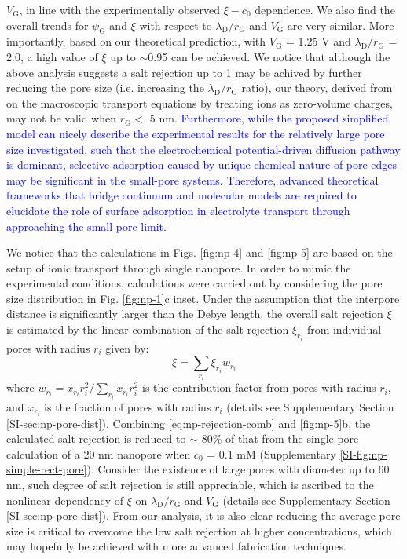 $V_{\mathrm{G}}$, in line with the experimentally observed
$\xi - c_{0}$ dependence. We also find the overall trends for
$\psi_{\mathrm{G}}$ and $\xi$ with respect to
$\lambda_{\mathrm{D}}/r_{\mathrm{G}}$ and $V_{\mathrm{G}}$ are very
similar. More importantly, based on our theoretical prediction, with
$V_{\mathrm{G}}$ = 1.25 V and $\lambda_{\mathrm{D}} / r_{\mathrm{G}}$
= { 2.0}, a high value of $\xi$ up to $\sim$0.95 can be achieved.  We
notice that although the above analysis suggests a salt rejection up
to 1 may be achived by further reducing the pore size (i.e. increasing
the $\lambda_{\mathrm{D}}/r_{\mathrm{G}}$ ratio), our theory, derived
from on the macroscopic transport equations by treating ions as
zero-volume charges, may not be valid when $r_{\mathrm{G}}<$ 5
nm\cite{Jain_2015_subcontin_ion}. \textcolor{blue}{ Furthermore, while the proposed
  simplified model can nicely describe the experimental results for
  the relatively large pore size investigated, such that the
  electrochemical potential-driven diffusion pathway is dominant,
  selective adsorption caused by unique chemical nature of pore edges
  may be significant in the small-pore systems. Therefore, advanced
  theoretical frameworks that bridge continuum and molecular models
  are required to elucidate the role of surface adsorption in
  electrolyte transport through approaching the small pore limit. }



{
We notice that the calculations in Figs. \autoref{fig:np-4} and \autoref{fig:np-5} 
are based on the setup  of ionic transport through single nanopore.
In order to mimic the experimental conditions, 
calculations were carried out by considering the pore size distribution in Fig. \autoref{fig:np-1}c inset. 
Under the assumption that the interpore distance is significantly larger than the Debye length,
the overall salt rejection $\xi$ is
estimated by the linear combination of the salt rejection 
$\xi_{r_i}$ 
from individual pores with radius $r_i$ given by:
\begin{equation}
\label{eq:np-rejection-comb}
\xi = \sum_{r_{i}} \xi_{r_{i}} w_{r_{i}}
\end{equation}
where
$w_{r_{i}} = x_{r_{i}} r_{i}^{2} / \sum_{r_{i}} x_{r_{i}} r_{i}^{2} $
is the contribution factor from pores with radius $r_{i}$, and
$x_{r_{i}}$ is the fraction of pores with radius $r_{i}$ (details see
Supplementary Section \autoref{SI-sec:np-pore-dist}). Combining
 \autoref{eq:np-rejection-comb} and  \autoref{fig:np-5}b, the calculated
salt rejection is reduced to $\sim{}$ 80\% of that from the
single-pore calculation of a 20 nm nanopore when $c_{0}$ = 0.1 mM
(Supplementary  \autoref{SI-fig:np-simple-rect-pore}). Consider the
existence of large pores with diameter up to 60 nm, such degree of
salt rejection is still appreciable, which is ascribed to the
nonlinear dependency of $\xi$ on
$\lambda_{\mathrm{D}} / r_{\mathrm{G}}$ and $V_{\mathrm{G}}$ (details
see Supplementary Section \autoref{SI-sec:np-pore-dist}).}  From our
analysis, it is also clear reducing the average pore size is critical
to overcome the low salt rejection at higher concentrations, which may
hopefully be achieved with more advanced fabrication techniques.


